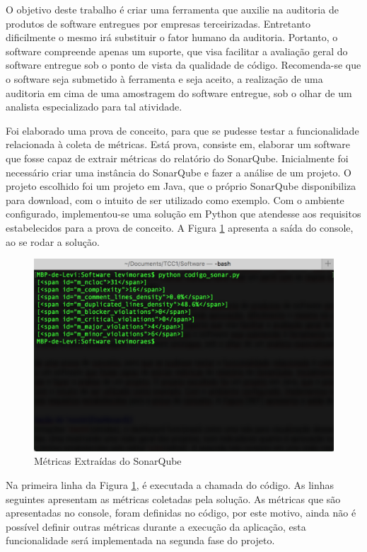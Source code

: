 O objetivo deste trabalho é criar uma ferramenta que auxilie na auditoria de produtos de software entregues por empresas terceirizadas. Entretanto dificilmente o mesmo irá substituir o fator humano da auditoria. Portanto, o software compreende apenas um suporte, que visa facilitar a avaliação geral do software entregue sob o ponto de vista da qualidade de código. Recomenda-se que o software seja submetido à ferramenta e seja aceito, a realização de uma auditoria em cima de uma amostragem do software entregue, sob o olhar de um analista especializado para tal atividade.

Foi elaborado uma prova de conceito, para que se pudesse testar a funcionalidade relacionada à coleta de métricas. Está prova, consiste em, elaborar um software que fosse capaz de extrair métricas do relatório do SonarQube. Inicialmente foi necessário criar uma instância do SonarQube e fazer a análise de um projeto. O projeto escolhido foi um projeto em Java, que o próprio SonarQube disponibiliza para download, com o intuito de ser utilizado como exemplo. Com o ambiente configurado, implementou-se uma solução em Python que atendesse aos requisitos estabelecidos para a prova de conceito. A Figura \ref{img:terminal} apresenta a saída do console, ao se rodar a solução.


\graphicspath{{figuras/}}
\begin{figure}[H]
\centering
\includegraphics[scale=0.60]{terminal.png}
\caption{Métricas Extraídas do SonarQube}
\label{img:terminal}
\end{figure}

Na primeira linha da Figura \ref{img:terminal}, é executada a chamada do código. As linhas seguintes apresentam as métricas coletadas pela solução. As métricas que são apresentadas no console, foram definidas no código, por este motivo, ainda não é possível definir outras métricas durante a execução da aplicação, esta funcionalidade será implementada na segunda fase do projeto. 


